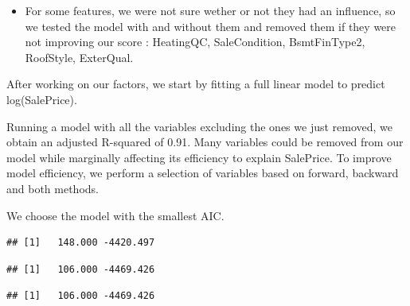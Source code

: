 \documentclass[]{article}
\providecommand{\tightlist}{%
  \setlength{\itemsep}{0pt}\setlength{\parskip}{0pt}}
\begin{document}
\begin{itemize}
\tightlist
\item
  For some features, we were not sure wether or not they had an
  influence, so we tested the model with and without them and removed
  them if they were not improving our score : HeatingQC, SaleCondition,
  BsmtFinType2, RoofStyle, ExterQual.
\end{itemize}

After working on our factors, we start by fitting a full linear model to
predict log(SalePrice).

Running a model with all the variables excluding the ones we just
removed, we obtain an adjusted R-squared of 0.91. Many variables could
be removed from our model while marginally affecting its efficiency to
explain SalePrice. To improve model efficiency, we perform a selection
of variables based on forward, backward and both methods.

We choose the model with the smallest AIC.

\begin{verbatim}
## [1]   148.000 -4420.497
\end{verbatim}

\begin{verbatim}
## [1]   106.000 -4469.426
\end{verbatim}

\begin{verbatim}
## [1]   106.000 -4469.426
\end{verbatim}
\end{document}
